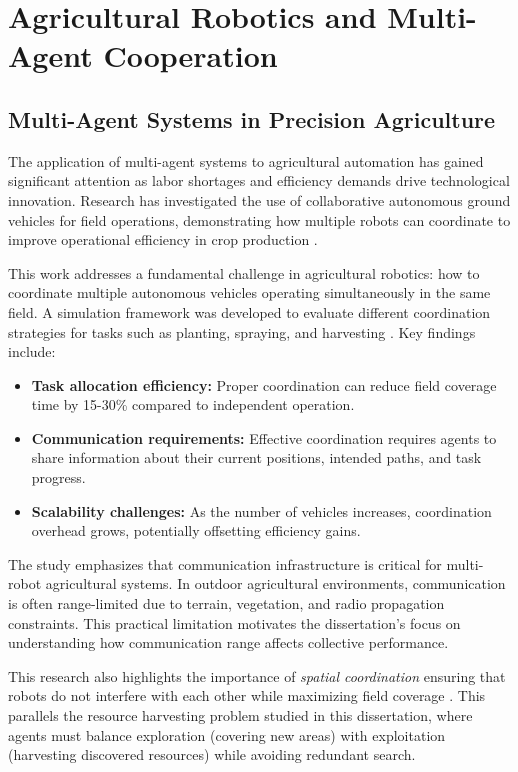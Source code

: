 \section{Agricultural Robotics and Multi-Agent Cooperation}

\subsection{Multi-Agent Systems in Precision Agriculture}

The application of multi-agent systems to agricultural automation has gained significant attention as labor shortages and efficiency demands drive technological innovation. Research has investigated the use of collaborative autonomous ground vehicles for field operations, demonstrating how multiple robots can coordinate to improve operational efficiency in crop production \citep{seyyedhasani2018}.

This work addresses a fundamental challenge in agricultural robotics: how to coordinate multiple autonomous vehicles operating simultaneously in the same field. A simulation framework was developed to evaluate different coordination strategies for tasks such as planting, spraying, and harvesting \citep{seyyedhasani2018}. Key findings include:

\begin{itemize}
    \item \textbf{Task allocation efficiency:} Proper coordination can reduce field coverage time by 15-30\% compared to independent operation.
    \item \textbf{Communication requirements:} Effective coordination requires agents to share information about their current positions, intended paths, and task progress.
    \item \textbf{Scalability challenges:} As the number of vehicles increases, coordination overhead grows, potentially offsetting efficiency gains.
\end{itemize}

The study emphasizes that communication infrastructure is critical for multi-robot agricultural systems. In outdoor agricultural environments, communication is often range-limited due to terrain, vegetation, and radio propagation constraints. This practical limitation motivates the dissertation's focus on understanding how communication range affects collective performance.

This research also highlights the importance of \emph{spatial coordination} ensuring that robots do not interfere with each other while maximizing field coverage \citep{seyyedhasani2018}. This parallels the resource harvesting problem studied in this dissertation, where agents must balance exploration (covering new areas) with exploitation (harvesting discovered resources) while avoiding redundant search.

